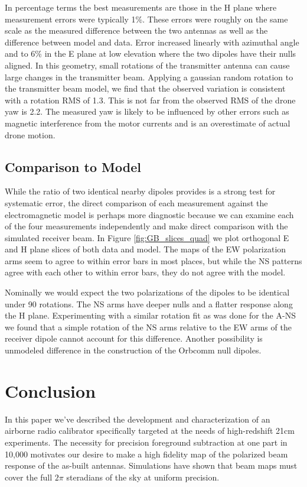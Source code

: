 \documentclass[preprint2,numberedappendix,tighten,twocolappendix]{aastex6}
\begin{document}
In percentage terms the best measurements are those in the H plane where measurement errors were typically 1\%. These errors were roughly on the same scale as the measured difference between the two antennas as well as the difference between model and data.  Error increased linearly with azimuthal angle and to 6\% in the E plane at low elevation where the two dipoles have their nulls aligned. In this geometry, small rotations of the transmitter antenna can cause large changes in the transmitter beam. Applying a gaussian random rotation to the transmitter beam model, we find that the observed variation is consistent with a rotation RMS of 1.3\arcdeg{}.  This is not far from the observed RMS of the drone yaw is 2.2\arcdeg{}.  The measured yaw is likely to be influenced by other errors such as magnetic interference from the motor currents and is an overestimate of actual drone motion.

\subsection{Comparison to Model}

While the ratio of two identical nearby dipoles provides is a strong test for systematic error, the direct comparison of each measurement against the electromagnetic model is perhaps more diagnostic because we can examine each of the four measurements independently and make direct comparison with the simulated receiver beam. In Figure \ref{fig:GB_slices_quad} we plot orthogonal E and H plane slices of both data and model. The maps of the EW polarization arms seem to agree to within error bars in most places, but while the NS patterns agree with each other to within error bars, they do not agree with the model. 

Nominally we would expect the two polarizations of the dipoles to be identical under 90\arcdeg{} rotations.  The NS arms have deeper nulls and a flatter response along the H plane. Experimenting with a similar rotation fit as was done for the A-NS we found that a simple rotation of the NS arms relative to the EW arms of the receiver dipole cannot account for this difference. Another possibility is unmodeled difference in the construction of the Orbcomm null dipoles.





\section{Conclusion}
\label{sec:conclusion}
In this paper we've described the development and characterization of an airborne radio calibrator specifically targeted at the needs of high-redshift 21cm experiments. The necessity for precision foreground subtraction at one part in 10,000 motivates our desire to make a high fidelity map of the polarized beam response of the as-built antennas. Simulations have shown that beam maps must cover the full $2\pi$ steradians of the sky at uniform precision. 
\end{document}
